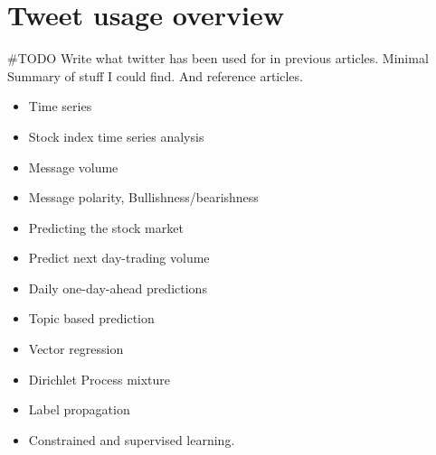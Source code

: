 \chapter{Tweet usage overview}


#TODO Write what twitter has been used for in previous articles. Minimal Summary
of stuff I could find. And reference articles.  
\begin{itemize}
    \item Time series
    \item Stock index time series analysis
    \item Message volume
    \item Message polarity, Bullishness/bearishness
    \item Predicting the stock market
    \item Predict next day-trading volume
    \item Daily one-day-ahead predictions
    \item Topic based prediction
    \item Vector regression
    \item Dirichlet Process mixture
    \item Label propagation
    \item Constrained and supervised learning. 
\end{itemize}
